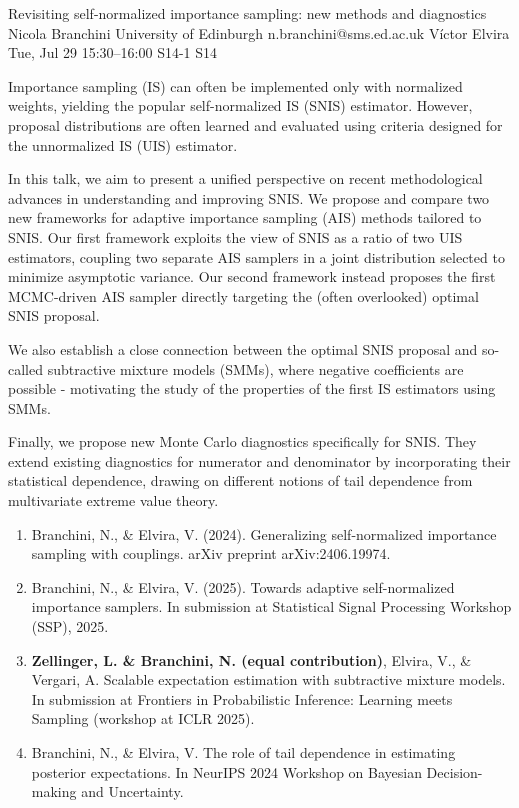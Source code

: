 \begin{talk}
  {Revisiting self-normalized importance sampling: new methods and diagnostics}%
  {Nicola Branchini}%
  {University of Edinburgh}%
  {n.branchini@sms.ed.ac.uk}%
  {V\'ictor Elvira}%
  {}%
  {Tue, Jul 29 15:30--16:00}%
  {S14-1}%
  {S14}%
  
    
   
Importance sampling (IS) can often be implemented only with normalized weights, yielding the popular self-normalized IS (SNIS) estimator. However, proposal distributions are often learned and evaluated using criteria designed for the unnormalized IS (UIS) estimator.

In this talk, we aim to present a unified perspective on recent methodological advances in understanding and improving SNIS.
We propose and compare two new frameworks for adaptive importance sampling (AIS) methods tailored to SNIS. Our first framework exploits the view of SNIS as a ratio of two UIS estimators, coupling two separate AIS samplers in a joint distribution selected to minimize asymptotic variance. Our second framework instead proposes the first MCMC-driven AIS sampler directly targeting the (often overlooked) optimal SNIS proposal.

We also establish a close connection between the optimal SNIS proposal and so-called subtractive mixture models (SMMs), where negative coefficients are possible - motivating the study of the properties of the first IS estimators using SMMs.

Finally, we propose new Monte Carlo diagnostics specifically for SNIS. They extend existing diagnostics for numerator and denominator by incorporating their statistical dependence, drawing on different notions of tail dependence from multivariate extreme value theory.

\medskip

\begin{enumerate}
 \item[{[1]}] Branchini, N., \& Elvira, V. (2024). Generalizing self-normalized importance sampling with couplings. arXiv preprint arXiv:2406.19974.
 \item[{[2]}] Branchini, N., \& Elvira, V. (2025). Towards adaptive self-normalized importance samplers. In submission at Statistical Signal Processing Workshop (SSP), 2025.
    \item[{[3]}] \textbf{Zellinger, L. \& Branchini, N. (equal contribution)}, Elvira, V., \& Vergari, A. Scalable expectation estimation with subtractive mixture models. In submission at Frontiers in Probabilistic Inference: Learning meets Sampling (workshop at ICLR 2025).
    \item[{[4]}] Branchini, N., \& Elvira, V. The role of tail dependence in estimating posterior expectations. In NeurIPS 2024 Workshop on Bayesian Decision-making and Uncertainty.


\end{enumerate}

\end{talk}

